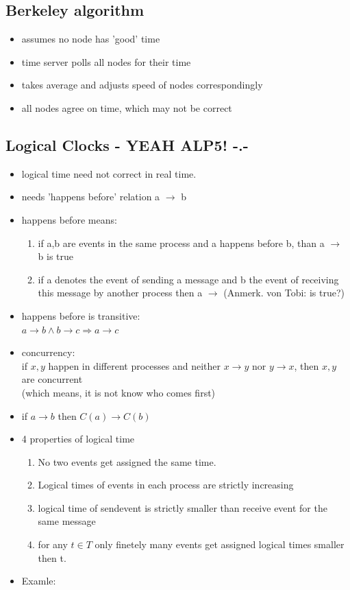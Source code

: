 \documentclass[ngerman,a4paper]{report}
\begin{document}
\subsection{Berkeley algorithm}
\begin{itemize}
\item assumes no node has 'good' time
\item time server polls all nodes for their time
\item takes average and adjusts speed of nodes correspondingly
\item all nodes agree on time, which may not be correct
\end{itemize}

\subsection{Logical Clocks - YEAH ALP5! -.-}
\begin{itemize}
\item logical time need not correct in real time.
\item needs 'happens before' relation a $\rightarrow$ b
\item happens before means:
\begin{enumerate}
\item if a,b are events in the same process and a happens before b, than a $\rightarrow$ b is true
\item if a denotes the event of sending a message and b the event of receiving this message by another process then a $\rightarrow$ (Anmerk. von Tobi: is true?)
\end{enumerate}
\item happens before is transitive:\\
$a \rightarrow b \land b \rightarrow c \Rightarrow a \rightarrow c$
\item concurrency:\\
if $x, y$ happen in different processes and neither $x \rightarrow y$ nor $y \rightarrow x$, then $x, y$ are concurrent\\
(which means, it is not know who comes first)
\item if $a \rightarrow b$ then $C(a) \rightarrow C(b)$
\item 4 properties of logical time
\begin{enumerate}
\item No two events get assigned the same time.
\item Logical times of events in each process are strictly increasing
\item logical time of sendevent is strictly smaller than receive event for the same message
\item for any $t \in T$ only finetely many events get assigned logical times smaller then  t.
\end{enumerate}
\item Examle:

\end{itemize}
\end{document}
